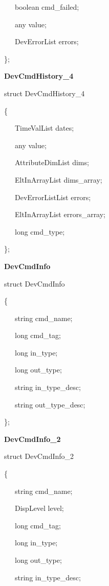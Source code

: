 ~~~boolean cmd\_failed;

~~~any value;

~~~DevErrorList errors;

\};\\


\begin{flushleft}
\textbf{DevCmdHistory\_4}
\par\end{flushleft}

struct DevCmdHistory\_4

\{

~~~TimeValList dates;

~~~any value;

~~~AttributeDimList dims;

~~~EltInArrayList dims\_array;

~~~DevErrorListList errors;

~~~EltInArrayList errors\_array;

~~~long cmd\_type;

\};\\


\begin{flushleft}
\textbf{DevCmdInfo}
\par\end{flushleft}

struct DevCmdInfo

\{

~~~string cmd\_name;

~~~long cmd\_tag;

~~~long in\_type;

~~~long out\_type;

~~~string in\_type\_desc;

~~~string out\_type\_desc;

\};\\


\begin{flushleft}
\textbf{DevCmdInfo\_2}
\par\end{flushleft}

struct DevCmdInfo\_2

\{

~~~string cmd\_name;

~~~DispLevel level;

~~~long cmd\_tag;

~~~long in\_type;

~~~long out\_type;

~~~string in\_type\_desc;

